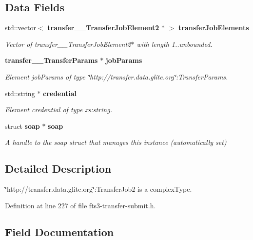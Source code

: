 \subsection*{Data Fields}
\begin{DoxyCompactItemize}
\item 
std::vector$<$ {\bf transfer\_\-\_\-TransferJobElement2} $\ast$ $>$ {\bf transferJobElements}
\begin{DoxyCompactList}\small\item\em Vector of transfer\_\-\_\-TransferJobElement2$\ast$ with length 1..unbounded. \item\end{DoxyCompactList}\item 
{\bf transfer\_\-\_\-TransferParams} $\ast$ {\bf jobParams}
\begin{DoxyCompactList}\small\item\em Element jobParams of type \char`\"{}http://transfer.data.glite.org\char`\"{}:TransferParams. \item\end{DoxyCompactList}\item 
std::string $\ast$ {\bf credential}
\begin{DoxyCompactList}\small\item\em Element credential of type xs:string. \item\end{DoxyCompactList}\item 
struct {\bf soap} $\ast$ {\bf soap}\label{classtransfer____TransferJob2_a17b51b9c1a0eb5dbca504d5003321107}

\begin{DoxyCompactList}\small\item\em A handle to the soap struct that manages this instance (automatically set) \item\end{DoxyCompactList}\end{DoxyCompactItemize}


\subsection{Detailed Description}
\char`\"{}http://transfer.data.glite.org\char`\"{}:TransferJob2 is a complexType. 

Definition at line 227 of file fts3-\/transfer-\/submit.h.



\subsection{Field Documentation}
